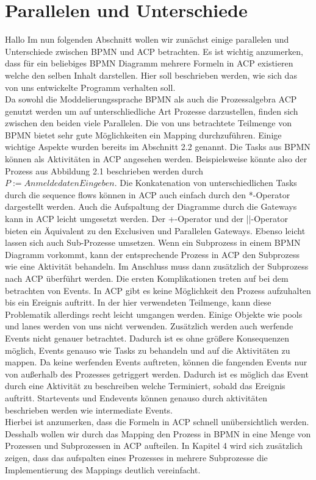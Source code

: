 \section{Parallelen und Unterschiede}\label{Parallelen und Unterschiede}
Hallo Im nun folgenden Abschnitt wollen wir zunächst einige parallelen und Unterschiede zwischen BPMN und ACP betrachten. Es ist wichtig anzumerken, dass für ein beliebiges BPMN Diagramm mehrere Formeln in ACP existieren welche den selben Inhalt darstellen. Hier soll beschrieben werden, wie sich das von uns entwickelte Programm verhalten soll.\\
Da sowohl die Moddelierungssprache BPMN als auch die Prozessalgebra ACP genutzt werden um auf unterschliedliche Art Prozesse darzustellen, finden sich zwischen den beiden viele Parallelen. Die von uns betrachtete Teilmenge von BPMN bietet sehr gute Möglichkeiten ein Mapping durchzuführen. Einige wichtige Aspekte wurden bereits im Abschnitt 2.2 genannt. Die Tasks aus BPMN können als Aktivitäten in ACP angesehen werden. Beispielsweise könnte also der Prozess aus Abbildung 2.1 beschrieben werden durch $P:=AnmeldedatenEingeben.$ Die Konkatenation von unterschiedlichen Tasks durch die sequence flows können in ACP auch einfach durch den *-Operator dargestellt werden. Auch die Aufspaltung der Diagramme durch die Gateways kann in ACP leicht umgesetzt werden. Der +-Operator und der ||-Operator bieten ein Äquivalent zu den Exclusiven und Parallelen Gateways. Ebenso leicht lassen sich auch Sub-Prozesse umsetzen. Wenn ein Subprozess in einem BPMN Diagramm vorkommt, kann der entsprechende Prozess in ACP den Subprozess wie eine Aktivität behandeln. Im Anschluss muss dann zusätzlich der Subprozess nach ACP überführt werden.
Die ersten Komplikationen treten auf bei dem betrachten von Events. In ACP gibt es keine Möglichkeit den Prozess aufzuhalten bis ein Ereignis auftritt. In der hier verwendeten Teilmenge, kann diese Problematik allerdings recht leicht umgangen werden. Einige Objekte wie pools und lanes werden von uns nicht verwenden. Zusätzlich werden auch werfende Events nicht genauer betrachtet. Dadurch ist es ohne größere Konsequenzen möglich, Events genauso wie Tasks zu behandeln und auf die Aktivitäten zu mappen. Da keine werfenden Events auftreten, können die fangenden Events nur von außerhalb des Prozesses getriggert werden. Dadurch ist es möglich das Event durch eine Aktivität zu beschreiben welche Terminiert, sobald das Ereignis auftritt. Startevents und Endevents können genauso durch aktivitäten beschrieben werden wie intermediate Events. \\
Hierbei ist anzumerken, dass die Formeln in ACP schnell unübersichtlich werden. Desshalb wollen wir durch das Mapping den Prozess in BPMN in eine Menge von Prozessen und Subprozessen in ACP aufteilen. In Kapitel 4 wird sich zusätzlich zeigen, dass das aufspalten eines Prozesses in mehrere Subprozesse die Implementierung des Mappings deutlich vereinfacht.\\
